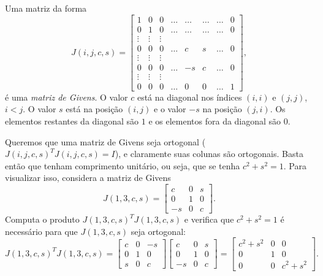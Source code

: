 \documentclass{article}
\begin{document}
\begin{defn}
    Uma matriz da forma
\[
    J(i,j,c,s) = \begin{bmatrix} 
        1 & 0 & 0 & \ldots & \ldots & \ldots & \ldots & 0 \\ 
        0 & 1 & 0 & \ldots & \ldots & \ldots & \ldots & 0 \\ 
        \vdots & \vdots & \vdots \\ 
        0 & 0 & 0 & \ldots & c & s & \ldots & 0 \\ 
        \vdots & \vdots & \vdots \\ 
        0 & 0 & 0 & \ldots & -s & c & \ldots & 0 \\ 
        \vdots & \vdots & \vdots \\ 
        0 & 0 & 0 & \ldots & 0 & 0 & \ldots & 1 
    \end{bmatrix},
\]
é uma \emph{matriz de Givens}. O valor \(c\) está na diagonal nos índices \((i,i)\) e \((j,j)\), \(i<j\). O valor \(s\) está na posição \((i,j)\) e o valor \(-s\) na posição \((j,i)\). Os elementos restantes da diagonal são \(1\) e os elementos fora da diagonal são \(0\).
\end{defn}

Queremos que uma matriz de Givens seja ortogonal (\(J(i,j,c,s)^T J(i,j,c,s) = I\)), e claramente suas colunas são ortogonais. Basta então que tenham comprimento unitário, ou seja, que se tenha \(c^2+s^2=1\). Para visualizar isso, considera a matriz de Givens
\[
    J(1,3,c,s) = \begin{bmatrix} c & 0 & s \\ 0 & 1 & 0 \\ -s & 0 & c \end{bmatrix}.
\]
Computa o produto \(J(1,3,c,s)^T J(1,3,c,s)\) e verifica que \(c^2+s^2=1\) é necessário para que \(J(1,3,c,s)\) seja ortogonal: 
\[
    J(1,3,c,s)^T J(1,3,c,s) = \begin{bmatrix} c & 0 & -s \\ 0 & 1 & 0 \\ s & 0 & c \end{bmatrix} \begin{bmatrix} c & 0 & s \\ 0 & 1 & 0 \\ -s & 0 & c \end{bmatrix} = \begin{bmatrix} c^2+s^2 & 0 & 0 \\ 0 & 1 & 0 \\ 0 & 0 & c^2+s^2 \end{bmatrix}.
\]
\end{document}

